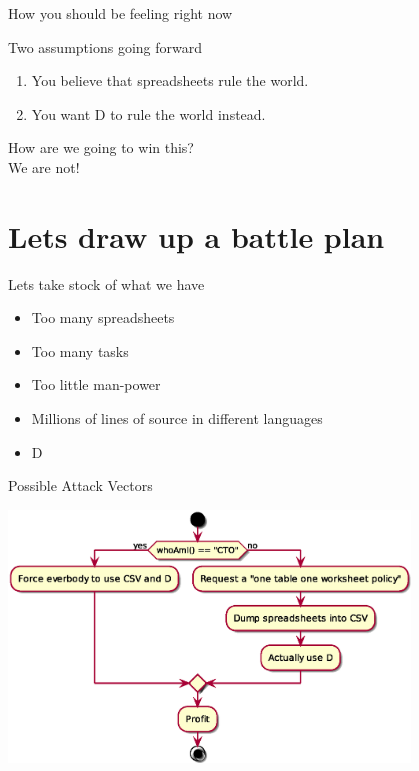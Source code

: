 \documentclass[aspectratio=169,notes]{beamer}
\begin{document}
	\begin{frame}{How you should be feeling right now}
		\begin{center}
		\end{center}
	\end{frame}

	\begin{frame}{Two assumptions going forward}
		\huge
		\begin{enumerate}
			\item You believe that spreadsheets rule the world.
			\item You want D to rule the world instead.
		\end{enumerate}
	\end{frame}

	\begin{frame}{\mbox{}}
		\begin{center}
			\huge
			How are we going to win this?\\[2cm]
			\pause
			We are not!
		\end{center}
	\end{frame}

	\section{Lets draw up a battle plan}

	\begin{frame}{Lets take stock of what we have}
		\large
		\begin{itemize}
			\item Too many spreadsheets
			\item Too many tasks
			\item Too little man-power\\[1cm] \pause
			\item Millions of lines of source in different languages
			\item D
		\end{itemize}
	\end{frame}

	\begin{frame}{Possible Attack Vectors}
		\begin{center}
		\includegraphics[width=0.8\textwidth]{attackvectors.eps}
		\end{center}
	\end{frame}
\end{document}
